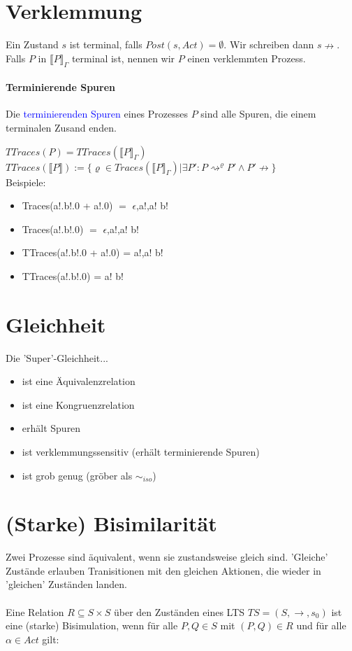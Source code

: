\documentclass[a4paper,10pt, oneside]{book}
\begin{document}
\section{Verklemmung}
Ein Zustand $s$ ist terminal, falls $Post(s, Act) = \emptyset$. Wir schreiben dann $s \nrightarrow$. Falls $P$ in $\llbracket P \rrbracket_{\Gamma}$ terminal ist, nennen wir $P$ einen verklemmten Prozess.

\paragraph{Terminierende Spuren}
Die \textcolor{blue}{terminierenden Spuren} eines Prozesses $P$ sind alle Spuren, die einem terminalen Zusand enden.

 $TTraces(P) = TTraces(\llbracket P \rrbracket_{\Gamma})$\\
 $TTraces(\llbracket P \rrbracket) := \{\varrho \in Traces(\llbracket P \rrbracket_{\Gamma}) | \exists P':P \rightsquigarrow^{\varrho} P' \wedge P' \nrightarrow\}$
\\

Beispiele:
\begin{itemize}
 \item Traces(a!.b!.0 + a!.0) $=$ \textbraceleft $\epsilon$,a!,a! b!\textbraceright
 \item Traces(a!.b!.0) $=$ \textbraceleft $\epsilon$,a!,a! b!\textbraceright
 \item TTraces(a!.b!.0 + a!.0) = \textbraceleft a!,a! b!\textbraceright
 \item TTraces(a!.b!.0) = \textbraceleft a! b!\textbraceright
\end{itemize}

\section{Gleichheit}
Die 'Super'-Gleichheit...
\begin{itemize}
 \item ist eine Äquivalenzrelation
 \item ist eine Kongruenzrelation
 \item erhält Spuren
 \item ist verklemmungssensitiv (erhält terminierende Spuren)
 \item ist grob genug (gröber als $\sim_{iso}$)
\end{itemize}

\section{(Starke) Bisimilarität}
Zwei Prozesse sind äquivalent, wenn sie zustandsweise gleich sind. 'Gleiche' Zustände erlauben Tranisitionen mit den gleichen Aktionen, die wieder in 'gleichen' Zuständen landen.\\
\\
Eine Relation $R \subseteq S \times S$ über den Zuständen eines LTS $TS = (S,\rightarrow,s_0)$ ist eine (starke) Bisimulation, wenn für alle $P,Q \in S$ mit $(P,Q) \in R$ und für alle $\alpha \in Act$ gilt:
\end{document}
